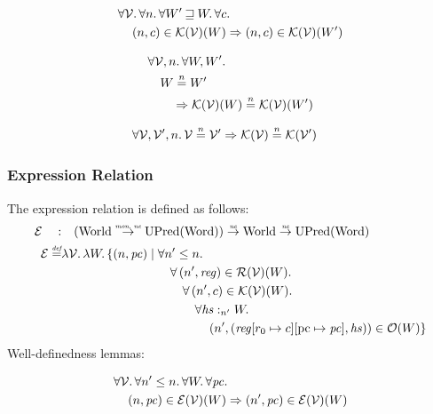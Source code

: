 \documentclass{article}
\newcommand{\update}[2]{[#1 \mapsto #2]}
\newcommand{\monnefun}{\stackrel{\textit{\tiny{mon, ne}}}{\rightarrow}}
\newcommand{\nefun}{\stackrel{\textit{\tiny{ne}}}{\rightarrow}}
\newcommand{\defeq}{\stackrel{\textit{\tiny{def}}}{=}}
\newcommand{\nequal}[1][n]{\stackrel{\tiny{#1}}{=}}
\newcommand{\var}[1]{\mathit{#1}}
\newcommand{\hs}{\var{hs}}
\newcommand{\pc}{\mathit{pc}}
\newcommand{\pcreg}{\mathrm{pc}}
\newcommand{\reg}{\var{reg}}
\newcommand{\heap}{\var{heap}}
\newcommand{\future}{\mathbin{\sqsupseteq}}
\newcommand{\heapSat}[3][\heap]{#1 :_{#2} #3}
\newcommand{\asmType}{\plaindom{AsmType}}
\newcommand{\plaindom}[1]{\mathrm{#1}}
\newcommand{\Words}{\plaindom{Word}}
\newcommand{\Worlds}{\plaindom{World}}
\newcommand{\UPred}[1]{\plaindom{UPred}(#1)}
\newcommand{\intr}[2]{\mathcal{#1}}
\newcommand{\valueintr}[1]{\intr{V}{#1}}
\newcommand{\exprintr}[1]{\intr{E}{#1}}
\newcommand{\contintr}[1]{\intr{K}{#1}}
\newcommand{\regintr}[1]{\intr{R}{#1}}
\newcommand{\stdvr}{\valueintr{\asmType}}
\newcommand{\stder}{\exprintr{\asmType}}
\newcommand{\stdrr}{\regintr{\asmType}}
\newcommand{\stdkr}{\contintr{\asmType}}
\newcommand{\observations}{\mathcal{O}}
\newcommand{\npair}[2][n]{\left(#1,#2 \right)}
\begin{document}
\begin{lemma}
\label{lem:stdkr-mono-worlds}
  \begin{align*}
    &\forall \stdvr \ldotp \forall n \ldotp \forall W' \future W \ldotp \forall c \ldotp\\
    &\quad \npair{c} \in \stdkr(\stdvr)(W) \Rightarrow \npair{c} \in \stdkr(\stdvr)(W')
  \end{align*}
\end{lemma}

\begin{lemma}
  \label{lem:stdkr-ne-worlds}
  \begin{align*}
    &\forall \stdvr, n \ldotp \forall W, W' \ldotp\\
    &\quad W \nequal W' \\
    &\qquad \Rightarrow \stdkr(\stdvr)(W) \nequal \stdkr(\stdvr)(W')
  \end{align*}
\end{lemma}

\begin{lemma}
\label{lem:stdkr-ne-vr}
\begin{align*}
  &\forall \stdvr, \stdvr', n \ldotp \stdvr \nequal \stdvr' \Rightarrow \stdkr(\stdvr) \nequal \stdkr(\stdvr')
\end{align*}
\end{lemma}


\subsubsection{Expression Relation}
\label{subsubsec:expression-relation}
The expression relation is defined as follows:
\begin{align*}
  \stder \quad : & \quad  (\Worlds \monnefun \UPred{\Words}) \nefun \Worlds \nefun \UPred{\Words} \\%
  \stder \defeq & \lambda \stdvr \ldotp \lambda W \ldotp \{ \npair{\pc} \mid 
  \begin{aligned}[t]
    & \forall n' \leq n \ldotp\\
    & \quad \forall \npair[n']{\reg} \in \stdrr(\stdvr)(W) \ldotp \\
    & \quad \quad \forall \npair[n']{c} \in \stdkr(\stdvr)(W) \ldotp \\
    & \quad \qquad  \forall \heapSat[\hs]{n'}{W} \ldotp \\
    & \quad \qquad \quad \npair[n']{(\reg\update{r_0}{c}\update{\pcreg}{\pc},\hs)} \in \observations(W) \}
  \end{aligned}
\end{align*}
Well-definedness lemmas:
\begin{lemma}
\label{lem:stder-dc}
  \begin{align*}
    & \forall \stdvr \ldotp \forall n' \leq n \ldotp \forall W \ldotp \forall \pc \ldotp\\
    & \quad \npair{\pc} \in \stder(\stdvr)(W) \Rightarrow \npair[n']{\pc} \in \stder(\stdvr)(W) 
 \end{align*}
\end{lemma}
\end{document}
